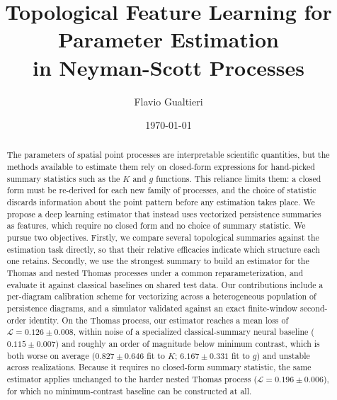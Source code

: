 \documentclass[11pt,letterpaper]{article}
\title{Topological Feature Learning for Parameter Estimation\\
       in Neyman-Scott Processes}
\author{Flavio Gualtieri}
\date{\today}
\newcommand{\1}{\mathds{1}}
\theoremstyle{plain}
\theoremstyle{definitioncolon}
\begin{document}
\maketitle



\begin{abstract}
The parameters of spatial point processes are interpretable scientific
quantities, but the methods available to estimate them rely on closed-form
expressions for hand-picked summary statistics such as the $K$ and $g$
functions. This reliance limits them: a closed form must be re-derived for each
new family of processes, and the choice of statistic discards information about
the point pattern before any estimation takes place. We propose a deep learning
estimator that instead uses vectorized persistence summaries as features, which
require no closed form and no choice of summary statistic. We pursue two
objectives. Firstly, we compare several topological summaries against the
estimation task directly, so that their relative efficacies indicate which
structure each one retains. Secondly, we use the strongest summary to build an
estimator for the Thomas and nested Thomas processes under a
common reparameterization, and evaluate it against classical baselines on shared
test data. Our contributions include a per-diagram calibration scheme for
vectorizing across a heterogeneous population of persistence diagrams, and a
simulator validated against an exact finite-window second-order identity.
On the Thomas process, our estimator reaches a mean loss of
$\mathcal{L}=0.126\pm0.008$, within noise of a specialized classical-summary
neural baseline ($0.115\pm0.007$) and roughly an order of magnitude below
minimum contrast, which is both worse on average ($0.827\pm0.646$ fit to $K$;
$6.167\pm0.331$ fit to $g$) and unstable across realizations. Because it
requires no closed-form summary statistic, the same estimator applies
unchanged to the harder nested Thomas process ($\mathcal{L}=0.196\pm0.006$),
for which no minimum-contrast baseline can be constructed at all.
\end{abstract}


\end{document}
